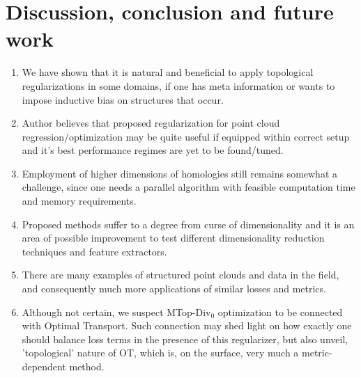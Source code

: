 \chapter{Discussion, conclusion and future work}
    \begin{enumerate}
        \item We have shown that it is natural and beneficial to apply topological regularizations in some domains, if one has meta information or wants to impose inductive bias on structures that occur.
        \item Author believes that proposed regularization for point cloud regression/optimization may be quite useful if equipped within correct setup and it's best performance regimes are yet to be found/tuned.
        \item Employment of higher dimensions of homologies still remains somewhat a challenge, since one needs a parallel algorithm with feasible computation time and memory requirements.
        \item Proposed methods suffer to a degree from curse of dimensionality and it is an area of possible improvement to test different dimensionality reduction techniques and feature extractors.
        \item There are many examples of structured point clouds and data in the field, and consequently much more applications of similar losses and metrics.
        \item Although not certain, we suspect MTop-Div${}_0$ optimization to be connected with Optimal Transport. Such connection may shed light on how exactly one should balance loss terms in the presence of this regularizer, but also unveil, 'topological' nature of OT, which is, on the surface, very much a metric-dependent method.
    \end{enumerate}

